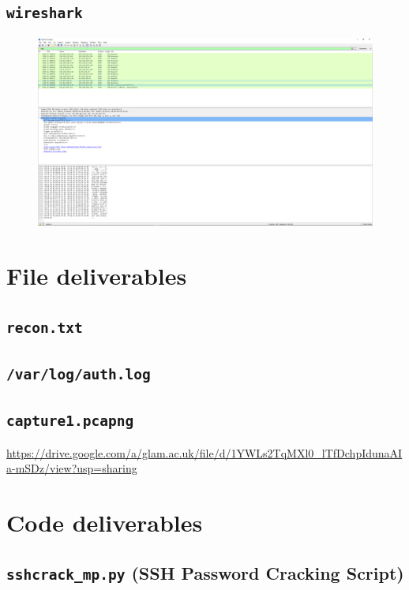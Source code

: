 \documentclass[12pt]{report}
\begin{document}
\section{\texttt{wireshark}}
\label{app:screenshots:7}
\begin{figure}[H]
  \centering
  \includegraphics[width=0.7\paperheight, angle=-90]{wireshark}
\end{figure}

\pagebreak
\chapter{File deliverables}
\section{\texttt{recon.txt}}
\label{app:files:recon}


\section{\texttt{/var/log/auth.log}}
\label{app:files:authlog}


\section{\texttt{capture1.pcapng}}
\label{app:links:capture_pcapng}
\url{https://drive.google.com/a/glam.ac.uk/file/d/1YWLs2TqMXl0\_lTfDchpIdunaAIa-mSDz/view?usp=sharing}

\pagebreak
\chapter{Code deliverables}
\section{\texttt{sshcrack\_mp.py} (SSH Password Cracking Script)}
\label{app:code:sshcrack_mp}

\end{document}
